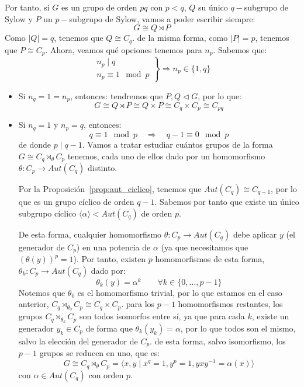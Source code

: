 Por tanto, si $G$ es un grupo de orden $pq$ con $p<q$, $Q$ su único $q-$subgrupo de Sylow y $P$ un $p-$subgrupo de Sylow, vamos a poder escribir siempre:
\begin{equation*}
    G \cong Q\rtimes P
\end{equation*}
Como $|Q| = q$, tenemos que $Q\cong C_q$. de la misma forma, como $|P| = p$, tenemos que $P\cong C_p$. Ahora, veamos qué opciones tenemos para $n_p$. Sabemos que:
\begin{equation*}
    \left.\begin{array}{r}
            n_p \mid q \\
            n_p \equiv 1 \mod p
    \end{array}\right\} \Longrightarrow n_p \in \{1,q\}
\end{equation*}
\begin{itemize}
    \item Si $n_q = 1 = n_p$, entonces: tendremos que $P, Q\lhd G$, por lo que:
        \begin{equation*}
            G\cong Q\rtimes P \cong Q\times P \cong C_q \times C_p \cong C_{pq}
        \end{equation*}
    \item Si $n_q = 1$ y $n_p = q$, entonces:
        \begin{equation*}
            q \equiv 1 \mod p \quad \Longrightarrow \quad  q-1\equiv 0 \mod p
        \end{equation*}
        de donde $p\mid q-1$. Vamos a tratar estudiar cuántos grupos de la forma $G\cong C_q\rtimes_\theta C_p$ tenemos, cada uno de ellos dado por un homomorfismo $\theta:C_p\to Aut(C_q)$ distinto. 

        Por la Proposición~\ref{prop:aut_ciclico}, tenemos que $Aut(C_q)\cong C_{q-1}$, por lo que es un grupo cíclico de orden $q-1$. Sabemos por tanto que existe un único subgrupo cíclico $\langle \alpha \rangle < Aut(C_q) $ de orden $p$. 

        De esta forma, cualquier homomorfismo $\theta:C_p\to Aut(C_q)$ debe aplicar $y$ (el generador de $C_p$) en una potencia de $\alpha$ (ya que necesitamos que ${(\theta(y))}^{p} = 1$). Por tanto, existen $p$ homomorfismos de esta forma, $\theta_k:C_p\to Aut(C_q)$ dado por:
        \begin{equation*}
            \theta_k(y) = \alpha^k \qquad \forall k \in \{0,\ldots,p-1\}
        \end{equation*}
        Notemos que $\theta_0$ es el homomorfismo trivial, por lo que estamos en el caso anterior, $C_q\rtimes_{\theta_0} C_p \cong C_q\times C_p$. para los $p-1$ homomorfismos restantes, los grupos $C_q\rtimes_{\theta_k} C_p$ son todos isomorfos entre sí, ya que para cada $k$, existe un generador $y_k \in C_p$ de forma que $\theta_k(y_k) = \alpha$, por lo que todos son el mismo, salvo la elección del generador de $C_p$. de esta forma, salvo isomorfismo, los $p-1$ grupos se reducen en uno, que es:
        \begin{equation*}
            G \cong C_q\rtimes_\theta C_p = \langle x,y \mid x^q = 1, y^p = 1, yxy^{-1}= \alpha(x) \rangle 
        \end{equation*}
        con $\alpha\in Aut(C_q)$ con orden $p$.
\end{itemize}

